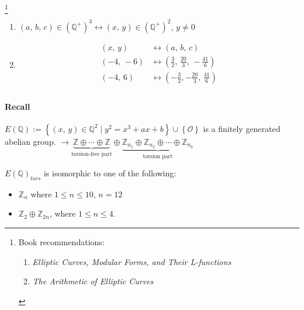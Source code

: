 \footnote{Book recommendations:
\begin{enumerate}
    \item \textit{Elliptic Curves, Modular Forms, and Their L-functions}
    \item \textit{The Arithmetic of Elliptic Curves}
\end{enumerate}
}
\begin{remark}
    \begin{enumerate}
        \item $\left(a,\,b,\,c\right)\in\left(\mathbb{Q}^+\right)^3
        \leftrightarrow \left(x,\,y\right)\in\left(\mathbb{Q}^+\right)^2$, $y \neq 0$
        \item \begin{align*}
            \left(x,\,y\right) &\leftrightarrow \left(a,\,b,\,c\right) \\
            \left(-4,\,-6\right) &\leftrightarrow \left(\frac{3}{2},\,\frac{20}{3},\,-\frac{41}{6}\right) \\
            \left(-4,\,6\right) &\leftrightarrow \left(-\frac{3}{2},-\frac{20}{3},\,\frac{41}{6}\right) \\
        \end{align*}
    \end{enumerate}
\end{remark}

\paragraph{Recall} $E\left(\mathbb{Q}\right):=\left\{\left(x,\,y\right)\in\mathbb{Q}^2\mid y^2=x^3+ax+b\right\}\cup\left\{\mathcal{O}\right\}$
is a finitely generated abelian group. $\rightarrow \underbrace{\mathbb{Z} \oplus \cdots \oplus \mathbb{Z}}_{\text{torsion-free part}}
\oplus \underbrace{\mathbb{Z}_{n_1} \oplus \mathbb{Z}_{n_2} \oplus \cdots \oplus \mathbb{Z}_{n_k}}_{\text{torsion part}}$

\begin{theorem}
    $E\left(\mathbb{Q}\right)_{tors}$ is isomorphic to one of the following:
    \begin{itemize}
        \item $\mathbb{Z}_n$ where $1 \leq n \leq 10$, $n = 12$
        \item $\mathbb{Z}_2 \oplus \mathbb{Z}_{2n}$, where $1 \leq n \leq 4$.
    \end{itemize}
\end{theorem}


